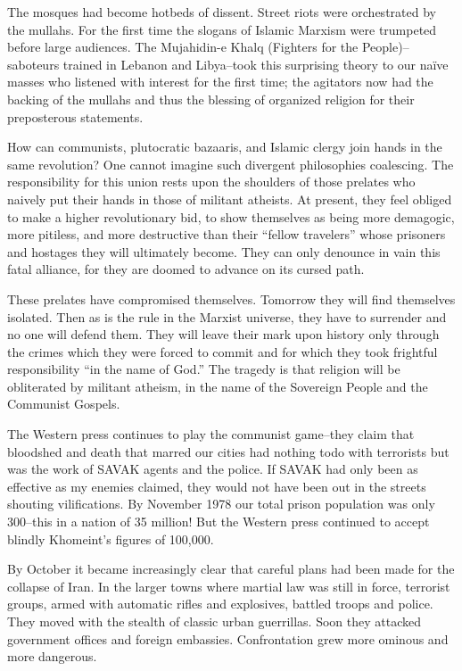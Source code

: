 The mosques had become hotbeds of dissent. Street riots were orchestrated by the mullahs. For the first time the slogans of Islamic Marxism were trumpeted before large audiences. The Mujahidin-e Khalq (Fighters for the People)--saboteurs trained in Lebanon and Libya--took this surprising theory to our naïve masses who listened with interest for the first time; the agitators now had the backing of the mullahs and thus the blessing of organized religion for their preposterous statements. 

How can communists, plutocratic bazaaris, and Islamic clergy join hands in the same revolution? One cannot imagine such divergent philosophies coalescing. The responsibility for this union rests upon the shoulders of those prelates who naively put their hands in those of militant atheists. At present, they feel obliged to make a higher revolutionary bid, to show themselves as being more demagogic, more pitiless, and more destructive than their “fellow travelers” whose prisoners and hostages they will ultimately become. They can only denounce in vain this fatal alliance, for they are doomed to advance on its cursed path. 

These prelates have compromised themselves. Tomorrow they will find themselves isolated. Then as is the rule in the Marxist universe, they have to surrender and no one will defend them. They will leave their mark upon history only through the crimes which they were forced to commit and for which they took frightful responsibility “in the name of God.” The tragedy is that religion will be obliterated by militant atheism, in the name of the Sovereign People and the Communist Gospels. 

The Western press continues to play the communist game--they claim that bloodshed and death that marred our cities had nothing todo with terrorists but was the work of SAVAK agents and the police. If SAVAK had only been as effective as my enemies claimed, they would not have been out in the streets shouting vilifications. By November 1978 our total prison population was only 300--this in a nation of 35 million! But the Western press continued to accept blindly Khomeint's figures of 100,000. 


By October it became increasingly clear that careful plans had been made for the collapse of Iran. In the larger towns where martial law was still in force, terrorist groups, armed with automatic rifles and explosives, battled troops and police. They moved with the stealth of classic urban guerrillas. Soon they attacked government offices and foreign embassies. Confrontation grew more ominous and more dangerous. 

